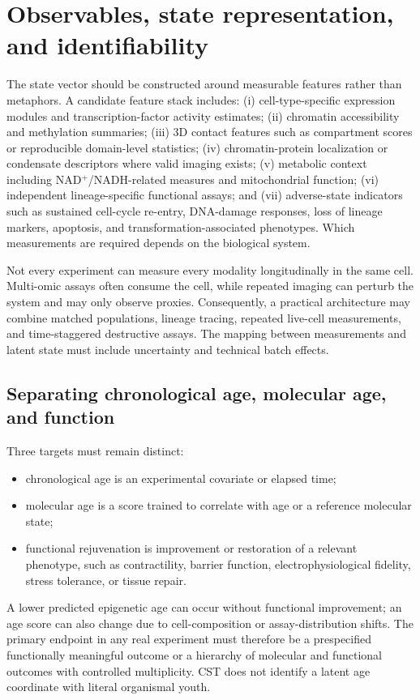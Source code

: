 \documentclass[11pt,a4paper]{article}
\theoremstyle{definition}
\theoremstyle{remark}
\begin{document}
\section{Observables, state representation, and identifiability}
The state vector should be constructed around measurable features rather than metaphors. A candidate feature stack includes: (i) cell-type-specific expression modules and transcription-factor activity estimates; (ii) chromatin accessibility and methylation summaries; (iii) 3D contact features such as compartment scores or reproducible domain-level statistics; (iv) chromatin-protein localization or condensate descriptors where valid imaging exists; (v) metabolic context including NAD$^+$/NADH-related measures and mitochondrial function; (vi) independent lineage-specific functional assays; and (vii) adverse-state indicators such as sustained cell-cycle re-entry, DNA-damage responses, loss of lineage markers, apoptosis, and transformation-associated phenotypes. Which measurements are required depends on the biological system.

Not every experiment can measure every modality longitudinally in the same cell. Multi-omic assays often consume the cell, while repeated imaging can perturb the system and may only observe proxies. Consequently, a practical architecture may combine matched populations, lineage tracing, repeated live-cell measurements, and time-staggered destructive assays. The mapping between measurements and latent state must include uncertainty and technical batch effects.

\subsection{Separating chronological age, molecular age, and function}
Three targets must remain distinct:
\begin{itemize}
\item chronological age is an experimental covariate or elapsed time;
\item molecular age is a score trained to correlate with age or a reference molecular state;
\item functional rejuvenation is improvement or restoration of a relevant phenotype, such as contractility, barrier function, electrophysiological fidelity, stress tolerance, or tissue repair.
\end{itemize}
A lower predicted epigenetic age can occur without functional improvement; an age score can also change due to cell-composition or assay-distribution shifts. The primary endpoint in any real experiment must therefore be a prespecified functionally meaningful outcome or a hierarchy of molecular and functional outcomes with controlled multiplicity. CST does not identify a latent age coordinate with literal organismal youth.
\end{document}
